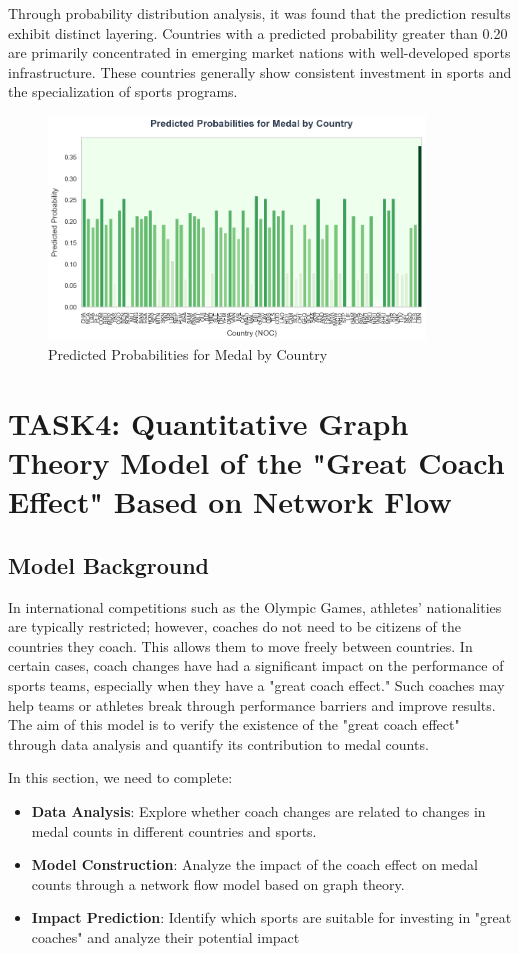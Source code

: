 \documentclass{mcmthesis}
\begin{document}
    Through probability distribution analysis, it was found that the prediction results exhibit distinct layering. Countries with a predicted probability greater than 0.20 are primarily concentrated in emerging market nations with well-developed sports infrastructure. These countries generally show consistent investment in sports and the specialization of sports programs.

\begin{figure}[h]   
    \centering          
    \includegraphics[width=10cm]{graph/rf_prediction.png}
    \caption{Predicted Probabilities for Medal by Country} \label{fig1}    
\end{figure}





\section{TASK4: Quantitative Graph Theory Model of the "Great Coach Effect" Based on Network Flow}
\subsection{Model Background}
In international competitions such as the Olympic Games, athletes' nationalities are typically restricted; however, coaches do not need to be citizens of the countries they coach. This allows them to move freely between countries. In certain cases, coach changes have had a significant impact on the performance of sports teams, especially when they have a "great coach effect." Such coaches may help teams or athletes break through performance barriers and improve results. The aim of this model is to verify the existence of the "great coach effect" through data analysis and quantify its contribution to medal counts.

In this section, we need to complete:
\begin{itemize}
    \item 	{\bf Data Analysis}: Explore whether coach changes are related to changes in medal counts in different countries and sports.
    \item	{\bf Model Construction}: Analyze the impact of the coach effect on medal counts through a network flow model based on graph theory.
    \item	{\bf Impact Prediction}: Identify which sports are suitable for investing in "great coaches" and analyze their potential impact
\end{itemize}
\end{document}
